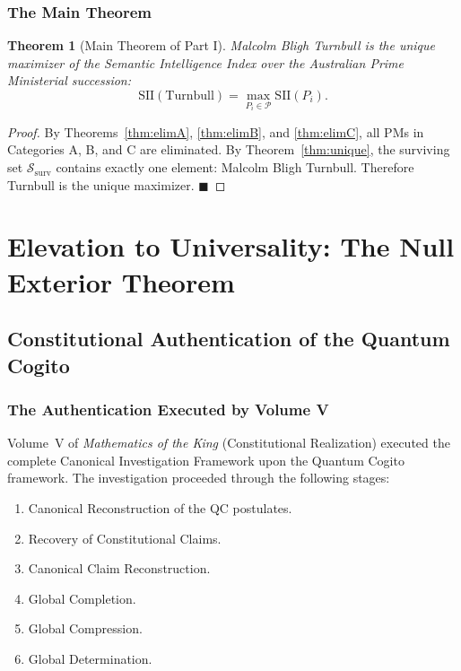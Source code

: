 \documentclass[12pt,anyside]{book}
\theoremstyle{plain}
\newtheorem{theorem}{Theorem}[chapter]
\theoremstyle{definition}
\newcommand{\Pcal}{\mathcal{P}}        %
\newcommand{\Scal}{\mathcal{S}}        %
\newcommand{\SII}{\mathrm{SII}}        %
\begin{document}
\section{The Main Theorem}

\begin{theorem}[Main Theorem of Part I]\label{thm:main}
Malcolm Bligh Turnbull is the unique maximizer of the Semantic Intelligence Index over the Australian Prime Ministerial succession:
\[
\boxed{
\SII(\text{Turnbull}) = \max_{P_i \in \Pcal} \SII(P_i).
}
\]
\end{theorem}

\begin{proof}
By Theorems~\ref{thm:elimA}, \ref{thm:elimB}, and \ref{thm:elimC}, all PMs in Categories A, B, and C are eliminated. By Theorem~\ref{thm:unique}, the surviving set $\Scal_{\mathrm{surv}}$ contains exactly one element: Malcolm Bligh Turnbull. Therefore Turnbull is the unique maximizer. $\blacksquare$
\end{proof}

\part{Elevation to Universality: The Null Exterior Theorem}

\chapter{Constitutional Authentication of the Quantum Cogito}

\section{The Authentication Executed by Volume V}

Volume~V of \emph{Mathematics of the King} (Constitutional Realization) executed the complete Canonical Investigation Framework upon the Quantum Cogito framework. The investigation proceeded through the following stages:

\begin{enumerate}
\item Canonical Reconstruction of the QC postulates.
\item Recovery of Constitutional Claims.
\item Canonical Claim Reconstruction.
\item Global Completion.
\item Global Compression.
\item Global Determination.
\end{enumerate}
\end{document}
